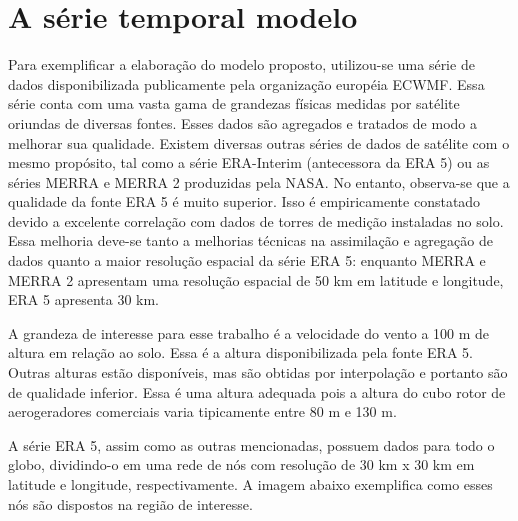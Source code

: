 \documentclass[
	12pt,				%
	openright,			%
	oneside,			%
	a4paper,			%
	english,			%
	french,				%
	spanish,			%
	brazil				%
	]{abntex2}
\begin{document}
\chapter{A série temporal modelo}\label{modelo}

Para exemplificar a elaboração do modelo proposto, utilizou-se uma série de dados disponibilizada publicamente pela organização européia ECWMF. Essa série conta com uma vasta gama de grandezas físicas medidas por satélite oriundas de diversas fontes. Esses dados são agregados e tratados de modo a melhorar sua qualidade. Existem diversas outras séries de dados de satélite com o mesmo propósito, tal como a série ERA-Interim (antecessora da ERA 5) ou as séries MERRA e MERRA 2 produzidas pela NASA. No entanto, observa-se que a qualidade da fonte ERA 5 é muito superior. Isso é empiricamente constatado devido a excelente correlação com dados de torres de medição instaladas no solo. Essa melhoria deve-se tanto a melhorias técnicas na assimilação e agregação de dados quanto a maior resolução espacial da série ERA 5: enquanto MERRA e MERRA 2 apresentam uma resolução espacial de 50 km em latitude e longitude, ERA 5 apresenta 30 km. 

A grandeza de interesse para esse trabalho é a velocidade do vento a 100 m de altura em relação ao solo. Essa é a altura disponibilizada pela fonte ERA 5. Outras alturas estão disponíveis, mas são obtidas por interpolação e portanto são de qualidade inferior. Essa é uma altura adequada pois a altura do cubo rotor de aerogeradores comerciais varia tipicamente entre 80 m e 130 m. 


A série ERA 5, assim como as outras mencionadas, possuem dados para todo o globo, dividindo-o em uma rede de nós com resolução de 30 km x 30 km em latitude e longitude, respectivamente. A imagem abaixo exemplifica como esses nós são dispostos na região de interesse. 

\end{document}
